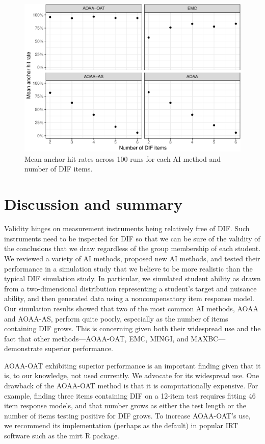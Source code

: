 \documentclass[
  11pt,
]{article}
\begin{document}
\begin{figure}[H]

{\centering \includegraphics[width=0.7\linewidth]{paper_files/figure-latex/anchorhit-1} 

}

\caption{Mean anchor hit rates across 100 runs for each AI method and number of DIF items.}\label{fig:anchorhit}
\end{figure}

\hypertarget{discussion-and-summary}{%
\section{Discussion and summary}\label{discussion-and-summary}}

Validity hinges on measurement instruments being relatively free of DIF. Such instruments need to be inspected for DIF so that we can be sure of the validity of the conclusions that we draw regardless of the group membership of each student. We reviewed a variety of AI methods, proposed new AI methods, and tested their performance in a simulation study that we believe to be more realistic than the typical DIF simulation study. In particular, we simulated student ability as drawn from a two-dimensional distribution representing a student's target and nuisance ability, and then generated data using a noncompensatory item response model. Our simulation results showed that two of the most common AI methods, AOAA and AOAA-AS, perform quite poorly, especially as the number of items containing DIF grows. This is concerning given both their widespread use and the fact that other methods---AOAA-OAT, EMC, MINGI, and MAXBC---demonstrate superior performance.

AOAA-OAT exhibiting superior performance is an important finding given that it is, to our knowledge, not used currently. We advocate for its widespread use. One drawback of the AOAA-OAT method is that it is computationally expensive. For example, finding three items containing DIF on a 12-item test requires fitting 46 item response models, and that number grows as either the test length or the number of items testing positive for DIF grows. To increase AOAA-OAT's use, we recommend its implementation (perhaps as the default) in popular IRT software such as the mirt R package.
\end{document}

